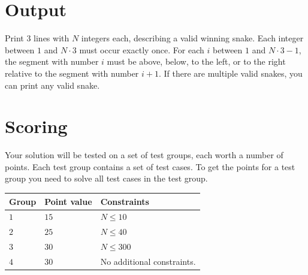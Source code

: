 \section*{Output}
\noindent
Print $3$ lines with $N$ integers each, describing a valid winning snake.
Each integer between $1$ and $N \cdot 3$ must occur exactly once. 
For each $i$ between $1$ and $N \cdot 3 - 1$, the segment with number $i$ must be above, 
below, to the left, or to the right relative to the segment with number $i+1$.
If there are multiple valid snakes, you can print any valid snake.

\section*{Scoring}
Your solution will be tested on a set of test groups, each worth a number of points. 
Each test group contains a set of test cases. 
To get the points for a test group you need to solve all test cases in the test group.

\noindent
\begin{tabular}{| l | l | p{12cm} |}
  \hline
  \textbf{Group} & \textbf{Point value} & \textbf{Constraints} \\ \hline
  $1$    & $15$         & $N \leq 10$  \\ \hline
  $2$    & $25$         & $N \leq 40$ \\ \hline
  $3$    & $30$         & $N \leq 300$ \\ \hline
  $4$    & $30$         & No additional constraints. \\ \hline
\end{tabular}

